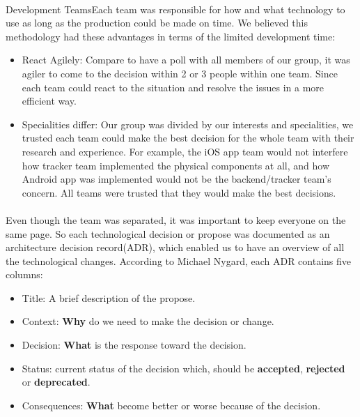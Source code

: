 \documentclass[12pt,a4paper]{article}
\begin{document}
        \paragraph{}Development TeamsEach team was responsible for how and what technology to use as long as the production could be made on time. We believed this methodology had these advantages in terms of the limited development time:

        \begin{itemize}
          \item {React Agilely}: Compare to have a poll with all members of our group, it was agiler to come to the decision within 2 or 3 people within one team. Since each team could react to the situation and resolve the issues in a more efficient way.
          \item {Specialities differ}: Our group was divided by our interests and specialities, we trusted each team could make the best decision for the whole team with their research and experience. For example, the iOS app team would not interfere how tracker team implemented the physical components at all, and how Android app was implemented would not be the backend/tracker team's concern. All teams were trusted that they would make the best decisions.
        \end{itemize}
        
        \paragraph{}Even though the team was separated, it was important to keep everyone on the same page. So each technological decision or propose was documented as an architecture decision record(ADR), which enabled us to have an overview of all the technological changes. According to Michael Nygard, each ADR contains five columns\cite{ArchitectureDecisionRecord}: 

        \begin{itemize}
          \item Title: A brief description of the propose.
          \item Context: {\bf Why} do we need to make the decision or change.                   
          \item Decision: {\bf What} is the response toward the decision.
          \item Status: current status of the decision which, should be {\bf accepted}, {\bf rejected} or {\bf deprecated}.
          \item Consequences: {\bf What} become better or worse because of the decision.
        \end{itemize}
\end{document}
